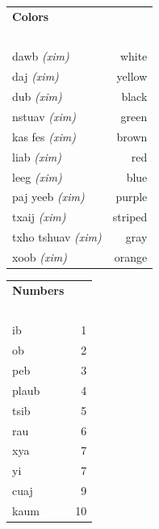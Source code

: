 \documentclass{article}
\begin{document}
\begin{multicols}{2}
[
\section*{}
]

\begin{tabular}{l r}
\textbf{Colors} \\
~\\

dawb {\em (xim)} &white\\
daj {\em (xim)} &yellow\\
dub {\em (xim)} &black\\
nstuav {\em (xim)} &green\\
kas fes {\em (xim)} &brown\\
liab {\em (xim)} &red\\
leeg {\em (xim)} &blue\\
paj yeeb {\em (xim)} &purple\\
txaij {\em (xim)} &striped\\
txho tshuav {\em (xim)} &gray\\
xoob {\em (xim)} &orange\\
\end{tabular}

\begin{tabular}{l r}
\textbf{Numbers} \\
~\\
ib &1\\
ob &2\\
peb &3\\
plaub &4\\
tsib &5\\
rau &6\\
xya &7\\
yi &7\\
cuaj &9\\
kaum &10\\
\end{tabular}
\end{multicols}
\end{document}
